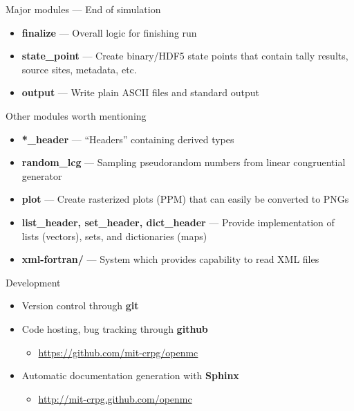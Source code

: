 \documentclass[noamssymb,svgnames]{beamer}
\begin{document}
\begin{frame}{Major modules --- End of simulation}
  \begin{itemize}
  \item\textbf{finalize} --- Overall logic for finishing run
  \item\textbf{state\_point} --- Create binary/HDF5 state points that
    contain tally results, source sites, metadata, etc.
  \item\textbf{output} --- Write plain ASCII files and standard output
  \end{itemize}
\end{frame}

\begin{frame}{Other modules worth mentioning}
  \begin{itemize}
  \item\textbf{*\_header} --- ``Headers'' containing derived types
  \item\textbf{random\_lcg} --- Sampling pseudorandom numbers from linear
    congruential generator
  \item\textbf{plot} --- Create rasterized plots (PPM) that can easily be
    converted to PNGs
  \item\textbf{list\_header, set\_header, dict\_header} --- Provide
    implementation of lists (vectors), sets, and dictionaries (maps)
  \item\textbf{xml-fortran/} --- System which provides capability to read
    XML files
  \end{itemize}
\end{frame}

\begin{frame}{Development}
  \begin{itemize}
  \item Version control through \textbf{git}
  \item Code hosting, bug tracking through \textbf{github}
    \begin{itemize}
    \item\url{https://github.com/mit-crpg/openmc}
    \end{itemize}
  \item Automatic documentation generation with \textbf{Sphinx}
    \begin{itemize}
    \item\url{http://mit-crpg.github.com/openmc}
    \end{itemize}
  \end{itemize}
\end{frame}
\end{document}
